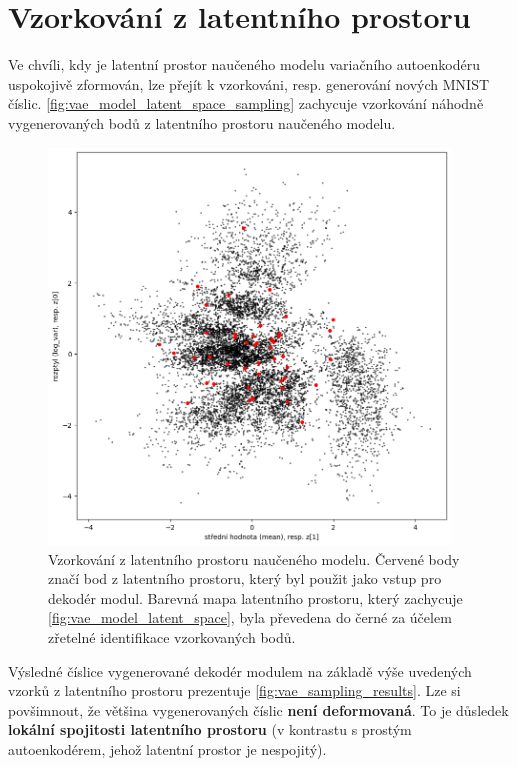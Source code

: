 \section{Vzorkování z latentního prostoru}
Ve chvíli, kdy je latentní prostor naučeného modelu variačního autoenkodéru uspokojivě zformován, lze přejít k vzorkováni, resp. generování nových MNIST číslic.
\autoref{fig:vae_model_latent_space_sampling} zachycuje vzorkování náhodně vygenerovaných bodů z latentního prostoru naučeného modelu.

\begin{figure}[H]
    \centering
    \includegraphics[width=0.95\textwidth]{figures/vae_model_latent_space_sampling.png}
    \caption{Vzorkování z latentního prostoru naučeného modelu. Červené body značí bod z latentního prostoru, který byl použit jako vstup pro dekodér modul. Barevná mapa latentního prostoru, který zachycuje \autoref{fig:vae_model_latent_space}, byla převedena do černé za účelem zřetelné identifikace vzorkovaných bodů.}
    \label{fig:vae_model_latent_space_sampling}
\end{figure}


Výsledné číslice vygenerované dekodér modulem na základě výše uvedených vzorků z latentního prostoru prezentuje \autoref{fig:vae_sampling_results}.
Lze si povšimnout, že většina vygenerovaných číslic \textbf{není deformovaná}.
To je důsledek \textbf{lokální spojitosti latentního prostoru} (v kontrastu s prostým autoenkodérem, jehož latentní prostor je nespojitý).


